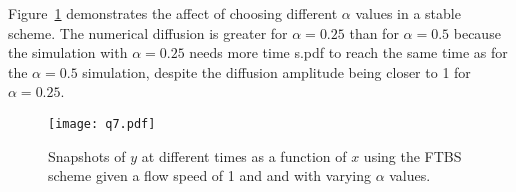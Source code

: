 \documentclass{article}
\begin{document}
\begin{homeworkProblem}

    Figure~\ref{fig:p7} demonstrates the affect of choosing different $\alpha$
    values in a stable scheme. The numerical diffusion is greater for $\alpha =
    0.25$ than for $\alpha = 0.5$ because the simulation with $\alpha = 0.25$
    needs more time s.pdf to reach the same time as for the $\alpha = 0.5$
    simulation, despite the diffusion amplitude being closer to 1 for $\alpha =
    0.25$.

    \begin{figure}[!ht]
    \begin{center}
        \texttt{[image: q7.pdf]} %

        \caption{\label{fig:p7} Snapshots of $y$ at different times as a
        function of $x$ using the FTBS scheme given a flow speed of 1 and
        and with varying $\alpha$ values.}

    \end{center}
    \end{figure}

\end{homeworkProblem}
\clearpage
\end{document}
